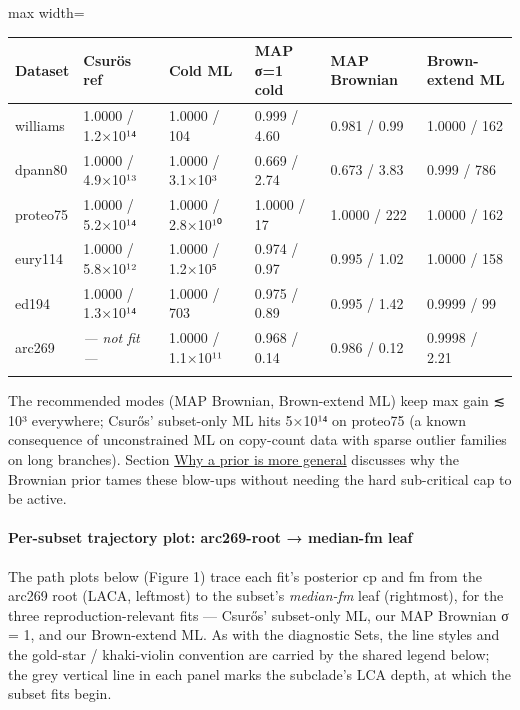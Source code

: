 \documentclass[
  10pt,
]{article}
\begin{document}
\begin{center}
\begin{adjustbox}{max width=\textwidth}
\begin{tabular}{@{}llllll@{}}
\toprule\noalign{}
Dataset & Csurös ref & Cold ML & MAP σ=1 cold & \textbf{MAP Brownian} &
\textbf{Brown-extend ML} \\
\midrule\noalign{}
williams & 1.0000 / 1.2×10¹⁴ & 1.0000 / 104 & 0.999 / 4.60 & 0.981 /
0.99 & 1.0000 / 162 \\
dpann80 & 1.0000 / 4.9×10¹³ & 1.0000 / 3.1×10³ & 0.669 / 2.74 & 0.673 /
3.83 & 0.999 / 786 \\
proteo75 & 1.0000 / 5.2×10¹⁴ & 1.0000 / 2.8×10¹⁰ & 1.0000 / 17 & 1.0000
/ 222 & 1.0000 / 162 \\
eury114 & 1.0000 / 5.8×10¹² & 1.0000 / 1.2×10⁵ & 0.974 / 0.97 & 0.995 /
1.02 & 1.0000 / 158 \\
ed194 & 1.0000 / 1.3×10¹⁴ & 1.0000 / 703 & 0.975 / 0.89 & 0.995 / 1.42 &
0.9999 / 99 \\
arc269 & \emph{--- not fit ---} & 1.0000 / 1.1×10¹¹ & 0.968 / 0.14 &
0.986 / 0.12 & 0.9998 / 2.21 \\
\bottomrule\noalign{}
\end{tabular}
\end{adjustbox}
\end{center}

The recommended modes (MAP Brownian, Brown-extend ML) keep max gain ≲
10³ everywhere; Csurős' subset-only ML hits 5×10¹⁴ on proteo75 (a known
consequence of unconstrained ML on copy-count data with sparse outlier
families on long branches). Section
\hyperref[why-a-prior-is-a-more-general-and-arguably-more-biological-choice]{Why
a prior is more general} discusses why the Brownian prior tames these
blow-ups without needing the hard sub-critical cap to be active.

\paragraph{Per-subset trajectory plot: arc269-root → median-fm
leaf}\label{per-subset-trajectory-plot-arc269-root--median-fm-leaf}

The path plots below (Figure 1) trace each fit's posterior cp and fm
from the arc269 root (LACA, leftmost) to the subset's \emph{median-fm}
leaf (rightmost), for the three reproduction-relevant fits --- Csurős'
subset-only ML, our MAP Brownian σ = 1, and our Brown-extend ML. As with
the diagnostic Sets, the line styles and the gold-star / khaki-violin
convention are carried by the shared legend below; the grey vertical
line in each panel marks the subclade's LCA depth, at which the subset
fits begin.
\end{document}

